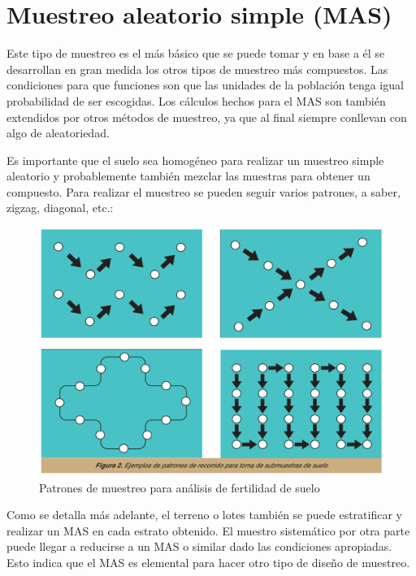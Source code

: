 \documentclass{report}
\begin{document}
\section{Muestreo aleatorio simple (MAS)}

Este tipo de muestreo es el más básico que se puede tomar y en base a él se desarrollan en gran medida los otros tipos de muestreo más compuestos. Las condiciones para que funciones son que las unidades de la población tenga igual probabilidad de ser escogidas. Los cálculos hechos para el MAS son también extendidos por otros métodos de muestreo, ya que al final siempre conllevan con algo de aleatoriedad. 

\bigbreak

Es importante que el suelo sea homogéneo para realizar un muestreo simple aleatorio y probablemente también mezclar las muestras para obtener un compuesto. Para realizar el muestreo se pueden seguir varios patrones, a saber, zigzag, diagonal, etc.:

\begin{figure}[H]
    \centering
    \includegraphics[width=0.3\paperwidth]{ref/sampling-patterns-srs.png}
    \caption{Patrones de muestreo para análisis de fertilidad de suelo \cite{lassaga-2011}}
\end{figure}

Como se detalla más adelante, el terreno o lotes también se puede estratificar y realizar un MAS en cada estrato obtenido. El muestro sistemático por otra parte puede llegar a reducirse a un MAS o similar dado las condiciones apropiadas. Esto indica que el MAS es elemental para hacer otro tipo de diseño de muestreo.
\end{document}
